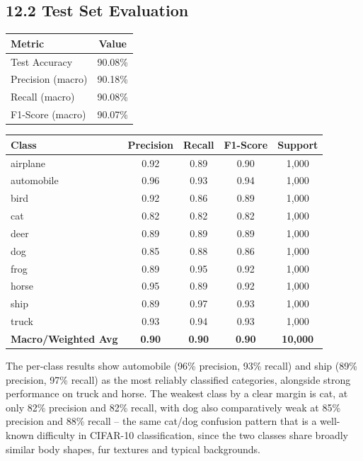 \documentclass[11pt,a4paper]{article}
\begin{document}
\subsection*{12.2 Test Set Evaluation}

\begin{center}
\begin{tabular}{|p{6cm}|c|}
\hline
\textbf{Metric} & \textbf{Value}\\
\hline
Test Accuracy & 90.08\%\\
\hline
Precision (macro) & 90.18\%\\
\hline
Recall (macro) & 90.08\%\\
\hline
F1-Score (macro) & 90.07\%\\
\hline
\end{tabular}
\end{center}

\vspace{0.15cm}

\begin{center}
\begin{tabular}{|p{3cm}|c|c|c|c|}
\hline
\textbf{Class} & \textbf{Precision} & \textbf{Recall} & \textbf{F1-Score} & \textbf{Support}\\
\hline
airplane & 0.92 & 0.89 & 0.90 & 1{,}000\\
\hline
automobile & 0.96 & 0.93 & 0.94 & 1{,}000\\
\hline
bird & 0.92 & 0.86 & 0.89 & 1{,}000\\
\hline
cat & 0.82 & 0.82 & 0.82 & 1{,}000\\
\hline
deer & 0.89 & 0.89 & 0.89 & 1{,}000\\
\hline
dog & 0.85 & 0.88 & 0.86 & 1{,}000\\
\hline
frog & 0.89 & 0.95 & 0.92 & 1{,}000\\
\hline
horse & 0.95 & 0.89 & 0.92 & 1{,}000\\
\hline
ship & 0.89 & 0.97 & 0.93 & 1{,}000\\
\hline
truck & 0.93 & 0.94 & 0.93 & 1{,}000\\
\hline
\textbf{Macro/Weighted Avg} & \textbf{0.90} & \textbf{0.90} & \textbf{0.90} & \textbf{10{,}000}\\
\hline
\end{tabular}
\end{center}

\vspace{0.15cm}

The per-class results show automobile (96\% precision, 93\% recall) and ship (89\% precision, 97\% recall) as the most reliably classified categories, alongside strong performance on truck and horse. The weakest class by a clear margin is cat, at only 82\% precision and 82\% recall, with dog also comparatively weak at 85\% precision and 88\% recall -- the same cat/dog confusion pattern that is a well-known difficulty in CIFAR-10 classification, since the two classes share broadly similar body shapes, fur textures and typical backgrounds.
\end{document}
